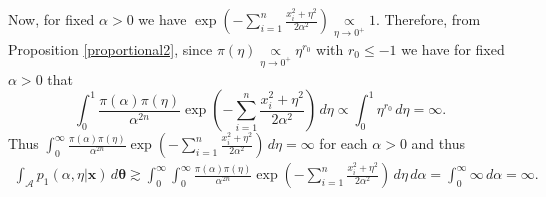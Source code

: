 \documentclass[12pt]{interact}
\theoremstyle{plain}%
\theoremstyle{definition}
\theoremstyle{remark}
\begin{document}
\begin{appendix}
Now, for fixed $\alpha>0$ we have $\exp\left( -\sum_{i=1}^{n}\frac{x_i^2 + \eta^2}{2\alpha^2} \right)\underset{\eta \to 0^+}{\propto} 1$. Therefore, from Proposition \ref{proportional2}, since $\pi(\eta)\underset{\eta\to 0^+}{\propto}\eta^{r_0}$ with $r_0\leq -1$ we have for fixed $\alpha>0$ that
\begin{equation*} \int_0^1 \frac{\pi(\alpha)\pi(\eta)}{\alpha^{2n}} \exp\left( -\sum_{i=1}^{n}\frac{x_i^2 + \eta^2}{2\alpha^2} \right)\, d\eta \propto  \int_0^1 \eta^{r_0}\, d\eta = \infty.
\end{equation*}
Thus $\int_0^\infty\frac{\pi(\alpha)\pi(\eta)}{ \alpha^{2n}}\exp\left( -\sum_{i=1}^{n}\frac{x_i^2 + \eta^2}{2\alpha^2} \right)\, d\eta=\infty$ for each $\alpha>0$ and thus
\begin{equation*}
\begin{aligned} \int_{\mathcal{A}} p_1(\alpha,\eta|\boldsymbol{x})\, d\boldsymbol{\theta} \gtrsim \int_0^\infty 
 \int_0^\infty\frac{\pi(\alpha)\pi(\eta)}{ \alpha^{2n}}\exp\left( -\sum_{i=1}^{n}\frac{x_i^2 + \eta^2}{2\alpha^2} \right)\, d\eta \, d\alpha = \int_0^\infty \infty \, d\alpha = \infty.
\end{aligned}
\end{equation*}


\end{appendix}
\end{document}
